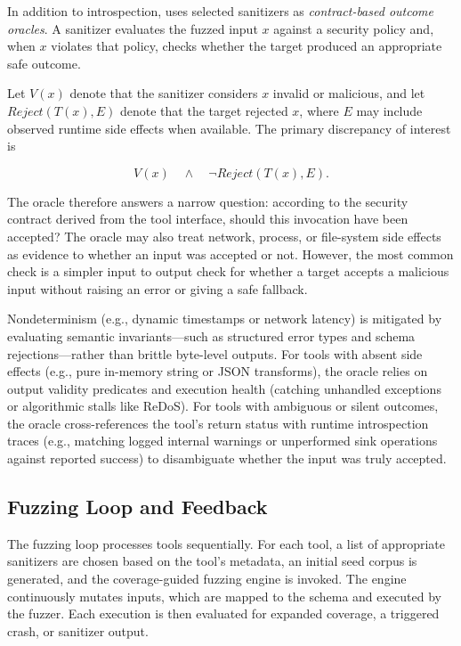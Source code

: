 In addition to introspection, \project{} uses selected sanitizers as \emph{contract-based outcome oracles}. A sanitizer evaluates the fuzzed input $x$ against a security policy and, when $x$ violates that policy, checks whether the target produced an appropriate safe outcome.

Let $V(x)$ denote that the sanitizer considers $x$ invalid or malicious, and let $\mathit{Reject}(T(x), E)$ denote that the target rejected $x$, where $E$ may include observed runtime side effects when available. The primary discrepancy of interest is

\[
V(x)
\quad\land\quad
\neg \mathit{Reject}(T(x), E).
\]

The oracle therefore answers a narrow question: according to the security contract derived from the tool interface, should this invocation have been accepted? The oracle may also treat network, process, or file-system side effects as evidence to whether an input was accepted or not. However, the most common check is a simpler input to output check for whether a target accepts a malicious input without raising an error or giving a safe fallback. 

Nondeterminism (e.g., dynamic timestamps or network latency) is mitigated by evaluating semantic invariants—such as structured error types and schema rejections—rather than brittle byte-level outputs. For tools with absent side effects (e.g., pure in-memory string or JSON transforms), the oracle relies on output validity predicates and execution health (catching unhandled exceptions or algorithmic stalls like ReDoS). For tools with ambiguous or silent outcomes, the oracle cross-references the tool's return status with runtime introspection traces (e.g., matching logged internal warnings or unperformed sink operations against reported success) to disambiguate whether the input was truly accepted.

\subsection{Fuzzing Loop and Feedback}
\label{sec:design-fuzzloop}

The fuzzing loop processes tools sequentially. For each tool, a list of appropriate sanitizers are chosen based on the tool's metadata, an initial seed corpus is generated, and the coverage-guided fuzzing engine is invoked. The engine continuously mutates inputs, which are mapped to the schema and executed by the fuzzer. Each execution is then evaluated for expanded coverage, a triggered crash, or sanitizer output.

